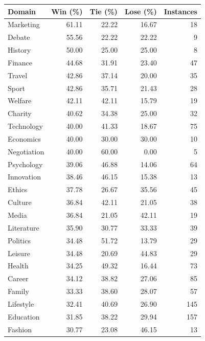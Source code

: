 \begin{table}[t]
    \footnotesize
    \centering
    \begin{tabular}{l rrrr}
        \toprule
        \textbf{Domain} & \textbf{Win (\%)} & \textbf{Tie (\%)} & \textbf{Lose (\%)} & \textbf{Instances} \\
        \midrule
        Marketing & 61.11 & 22.22 & 16.67 & 18 \\ 
        Debate & 55.56 & 22.22 & 22.22 & 9 \\ 
        History & 50.00 & 25.00 & 25.00 & 8 \\ 
        Finance & 44.68 & 31.91 & 23.40 & 47 \\ 
        Travel & 42.86 & 37.14 & 20.00 & 35 \\ 
        Sport & 42.86 & 35.71 & 21.43 & 28 \\ 
        Welfare & 42.11 & 42.11 & 15.79 & 19 \\ 
        Charity & 40.62 & 34.38 & 25.00 & 32 \\ 
        Technology & 40.00 & 41.33 & 18.67 & 75 \\ 
        Economics & 40.00 & 30.00 & 30.00 & 10 \\ 
        Negotiation & 40.00 & 60.00 & 0.00 & 5 \\ 
        Psychology & 39.06 & 46.88 & 14.06 & 64 \\ 
        Innovation & 38.46 & 46.15 & 15.38 & 13 \\ 
        Ethics & 37.78 & 26.67 & 35.56 & 45 \\ 
        Culture & 36.84 & 42.11 & 21.05 & 38 \\ 
        Media & 36.84 & 21.05 & 42.11 & 19 \\ 
        Literature & 35.90 & 30.77 & 33.33 & 39 \\ 
        Politics & 34.48 & 51.72 & 13.79 & 29 \\ 
        Leisure & 34.48 & 20.69 & 44.83 & 29 \\ 
        Health & 34.25 & 49.32 & 16.44 & 73 \\ 
        Career & 34.12 & 38.82 & 27.06 & 85 \\ 
        Family & 33.33 & 38.60 & 28.07 & 57 \\ 
        Lifestyle & 32.41 & 40.69 & 26.90 & 145 \\ 
        Education & 31.85 & 38.22 & 29.94 & 157 \\ 
        Fashion & 30.77 & 23.08 & 46.15 & 13 \\ 

\end{tabular}
\end{table}
